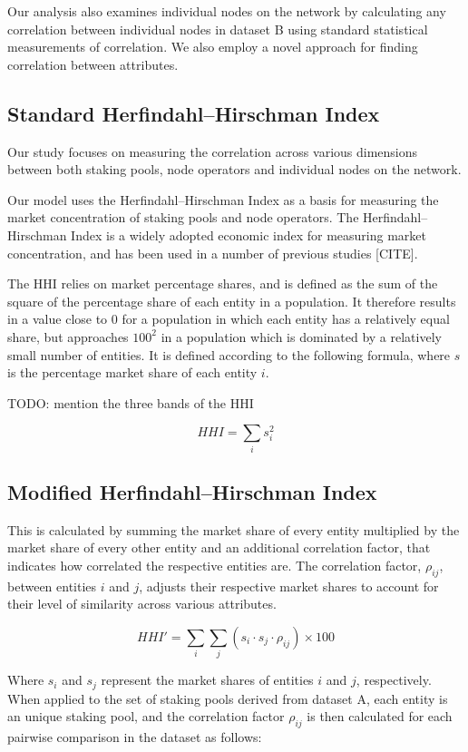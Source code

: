 \documentclass[conference]{IEEEtran}
\begin{document}
Our analysis also examines individual nodes on the network by calculating any correlation between individual nodes in dataset B using standard statistical measurements of correlation.  We also employ a novel approach for finding correlation between attributes.

\subsection{Standard Herfindahl–Hirschman Index}

Our study focuses on measuring the correlation across various dimensions between both staking pools, node operators and individual nodes on the network.

Our model uses the Herfindahl–Hirschman Index as a basis for measuring the market concentration of staking pools and node operators.  The Herfindahl–Hirschman Index is a widely adopted economic index for measuring market concentration, and has been used in a number of previous studies [CITE].

The HHI relies on market percentage shares, and is defined as the sum of the square of the percentage share of each entity in a population.  It therefore results in a value close to 0 for a population in which each entity has a relatively equal share, but approaches $100^2$ in a population which is dominated by a relatively small number of entities. It is defined according to the following formula, where $s$ is the percentage market share of each entity $i$.

TODO: mention the three bands of the HHI

\[
HHI = \sum_{i} s_i^2
\]

\subsection{Modified Herfindahl–Hirschman Index}
This is calculated by summing the market share of every entity multiplied by the market share of every other entity and an additional correlation factor, that indicates how correlated the respective entities are.  The correlation factor, $\rho_{ij}$, between entities $i$ and $j$, adjusts their respective market shares to account for their level of similarity across various attributes.

\[
HHI' = \sum_i \sum_j \left(s_i \cdot s_j \cdot \rho_{ij}\right) \times 100
\]

Where $s_i$ and $s_j$ represent the market shares of entities $i$ and $j$, respectively. When applied to the set of staking pools derived from dataset A, each entity is an unique staking pool, and the correlation factor $\rho_{ij}$ is then calculated for each pairwise comparison in the dataset as follows:
\end{document}

